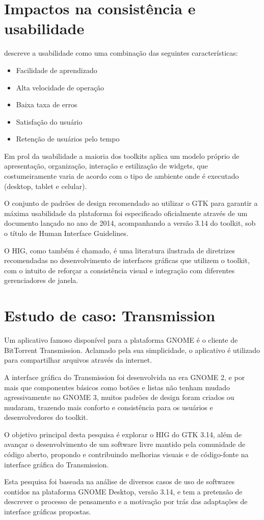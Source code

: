 \section{Impactos na consistência e usabilidade}

 descreve a usabilidade como uma combinação
das seguintes características:

\begin{itemize}
    \item Facilidade de aprendizado
    \item Alta velocidade de operação
    \item Baixa taxa de erros
    \item Satisfação do usuário
    \item Retenção de usuários pelo tempo
\end{itemize}

Em prol da usabilidade a maioria dos toolkits aplica um modelo próprio de
apresentação, organização, interação e estilização de widgets, que
costumeiramente varia de acordo com o tipo de ambiente onde é executado
(desktop, tablet e celular).

O conjunto de padrões de design recomendado ao utilizar o GTK para garantir a
máxima usabilidade da plataforma foi especificado oficialmente através de um
documento lançado no ano de 2014, acompanhando a versão 3.14 do toolkit, sob o
título de Human Interface Guidelines.

O HIG, como também é chamado, é uma literatura ilustrada de diretrizes
recomendadas no desenvolvimento de interfaces gráficas que utilizem o toolkit,
com o intuito de reforçar a consistência visual e integração com diferentes
gerenciadores de janela.

\section{Estudo de caso: Transmission}

Um aplicativo famoso disponível para a plataforma GNOME é o cliente de
BitTorrent Transmission. Aclamado pela sua simplicidade, o aplicativo é
utilizado para compartilhar arquivos através da internet.

A interface gráfica do Transmission foi desenvolvida na era GNOME 2, e por mais
que componentes básicos como botões e listas não tenham mudado agressivamente no
GNOME 3, muitos padrões de design foram criados ou mudaram, trazendo mais
conforto e consistência para os usuários e desenvolvedores do toolkit.

O objetivo principal desta pesquisa é explorar o HIG do GTK 3.14, além de
avançar o desenvolvimento de um software livre mantido pela comunidade de código
aberto, propondo e contribuindo melhorias visuais e de código-fonte na interface
gráfica do Transmission.

Esta pesquisa foi baseada na análise de diversos casos de uso de softwares
contidos na plataforma GNOME Desktop, versão 3.14, e tem a pretensão de
descrever o processo de pensamento e a motivação por trás das adaptações de
interface gráficas propostas.
